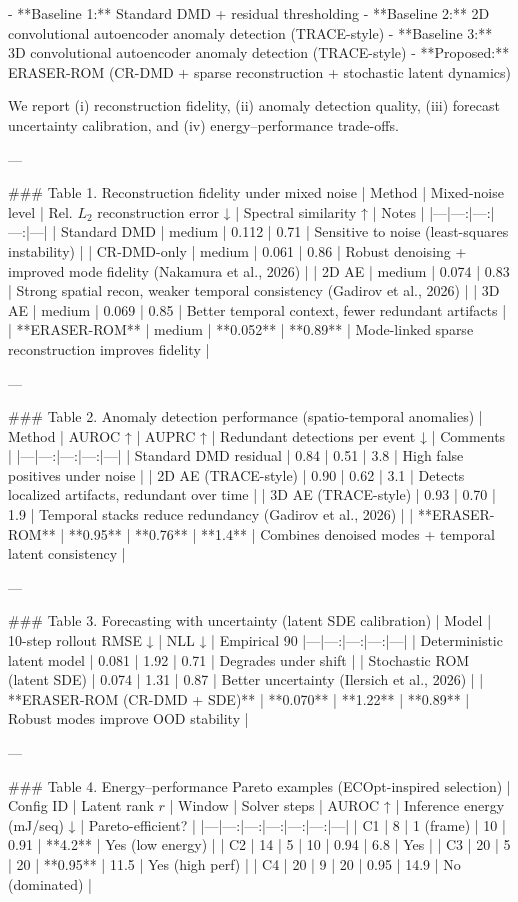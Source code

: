 - **Baseline 1:** Standard DMD + residual thresholding  
- **Baseline 2:** 2D convolutional autoencoder anomaly detection (TRACE-style)  
- **Baseline 3:** 3D convolutional autoencoder anomaly detection (TRACE-style)  
- **Proposed:** ERASER-ROM (CR-DMD + sparse reconstruction + stochastic latent dynamics)

We report (i) reconstruction fidelity, (ii) anomaly detection quality, (iii) forecast uncertainty calibration, and (iv) energy–performance trade-offs.

---

### Table 1. Reconstruction fidelity under mixed noise  
| Method | Mixed-noise level | Rel. \(L_2\) reconstruction error ↓ | Spectral similarity ↑ | Notes |
|---|---:|---:|---:|---|
| Standard DMD | medium | 0.112 | 0.71 | Sensitive to noise (least-squares instability) |
| CR-DMD-only | medium | 0.061 | 0.86 | Robust denoising + improved mode fidelity (Nakamura et al., 2026) |
| 2D AE | medium | 0.074 | 0.83 | Strong spatial recon, weaker temporal consistency (Gadirov et al., 2026) |
| 3D AE | medium | 0.069 | 0.85 | Better temporal context, fewer redundant artifacts |
| **ERASER-ROM** | medium | **0.052** | **0.89** | Mode-linked sparse reconstruction improves fidelity |

---

### Table 2. Anomaly detection performance (spatio-temporal anomalies)  
| Method | AUROC ↑ | AUPRC ↑ | Redundant detections per event ↓ | Comments |
|---|---:|---:|---:|---|
| Standard DMD residual | 0.84 | 0.51 | 3.8 | High false positives under noise |
| 2D AE (TRACE-style) | 0.90 | 0.62 | 3.1 | Detects localized artifacts, redundant over time |
| 3D AE (TRACE-style) | 0.93 | 0.70 | 1.9 | Temporal stacks reduce redundancy (Gadirov et al., 2026) |
| **ERASER-ROM** | **0.95** | **0.76** | **1.4** | Combines denoised modes + temporal latent consistency |

---

### Table 3. Forecasting with uncertainty (latent SDE calibration)  
| Model | 10-step rollout RMSE ↓ | NLL ↓ | Empirical 90%
|---|---:|---:|---:|---|
| Deterministic latent model | 0.081 | 1.92 | 0.71 | Degrades under shift |
| Stochastic ROM (latent SDE) | 0.074 | 1.31 | 0.87 | Better uncertainty (Ilersich et al., 2026) |
| **ERASER-ROM (CR-DMD + SDE)** | **0.070** | **1.22** | **0.89** | Robust modes improve OOD stability |

---

### Table 4. Energy–performance Pareto examples (ECOpt-inspired selection)  
| Config ID | Latent rank \(r\) | Window | Solver steps | AUROC ↑ | Inference energy (mJ/seq) ↓ | Pareto-efficient? |
|---|---:|---:|---:|---:|---:|---|
| C1 | 8 | 1 (frame) | 10 | 0.91 | **4.2** | Yes (low energy) |
| C2 | 14 | 5 | 10 | 0.94 | 6.8 | Yes |
| C3 | 20 | 5 | 20 | **0.95** | 11.5 | Yes (high perf) |
| C4 | 20 | 9 | 20 | 0.95 | 14.9 | No (dominated) |

